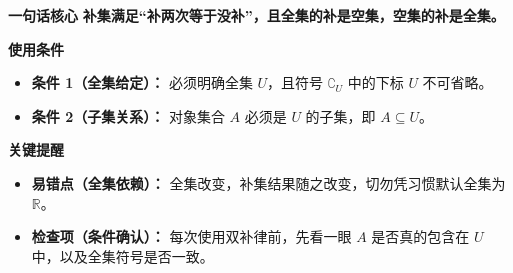 \begin{summarybox}
	\textbf{\textcolor{CSummary}{一句话核心}}
	\textbf{补集满足“补两次等于没补”，且全集的补是空集，空集的补是全集。}

	\medskip
	\textbf{\textcolor{CSummary}{使用条件}}
	\begin{itemize}[leftmargin=*, itemsep=0.5em, topsep=0.4em]
		\item \textbf{条件 1（全集给定）：} 必须明确全集 $U$，且符号 $\complement_U$ 中的下标 $U$ 不可省略。
		\item \textbf{条件 2（子集关系）：} 对象集合 $A$ 必须是 $U$ 的子集，即 $A\subseteq U$。
	\end{itemize}

	\medskip
	\textbf{\textcolor{CSummary}{关键提醒}}
	\begin{itemize}[leftmargin=*, itemsep=0.5em, topsep=0.4em]
		\item \textbf{易错点（全集依赖）：} 全集改变，补集结果随之改变，切勿凭习惯默认全集为 $\mathbb{R}$。
		\item \textbf{检查项（条件确认）：} 每次使用双补律前，先看一眼 $A$ 是否真的包含在 $U$ 中，以及全集符号是否一致。
	\end{itemize}
\end{summarybox}
